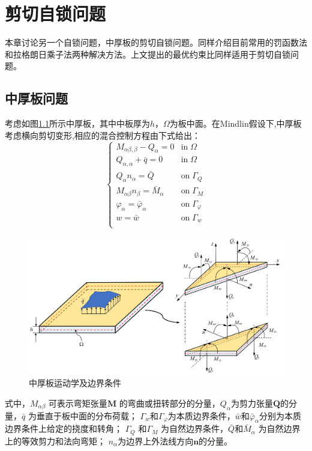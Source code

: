 \chapter{剪切自锁问题}
本章讨论另一个自锁问题，中厚板的剪切自锁问题。同样介绍目前常用的罚函数法和拉格朗日乘子法两种解决方法。上文提出的最优约束比同样适用于剪切自锁问题。

\section{中厚板问题}    
考虑如图\ref{mindlin_picture}所示中厚板，其中中板厚为$h$，$\Omega$为板中面。在Mindlin假设下,中厚板考虑横向剪切变形,相应的混合控制方程由下式给出：
\begin{equation}\label{strong_mindlin}
    \begin{cases}
        M_{\alpha\beta,\beta} - Q_\alpha = 0 & \textrm{in}\; \Omega \\
        Q_{\alpha,\alpha} + \bar q = 0 & \textrm{in}\; \Omega \\    Q_\alpha n_\alpha = \bar Q & \textrm{on}\; \Gamma_Q \\
        M_{\alpha\beta} n_\beta = \bar M_\alpha & \textrm{on}\; \Gamma_M \\
        \varphi_\alpha = \bar \varphi_\alpha & \textrm{on}\; \Gamma_\varphi \\
        w = \bar w & \textrm{on}\; \Gamma_w \\
    \end{cases}
\end{equation}
\begin{figure}[H]
    \centering 
        \includegraphics[scale=0.5]{figures/shearlocking/Mindlinplate.png}
        \caption{中厚板运动学及边界条件}\label{mindlin_picture}
\end{figure}
式中，$M_{\alpha \beta}$ 可表示弯矩张量$ \boldsymbol{M}$ 的弯曲或扭转部分的分量，$Q_\alpha$为剪力张量$\boldsymbol{Q}$的分量，$\bar{q}$ 为垂直于板中面的分布荷载；
$\Gamma_w$和$\Gamma_\varphi$为本质边界条件，$\bar{w}$和$\bar{\varphi}_\alpha$分别为本质边界条件上给定的挠度和转角；
$\Gamma_Q$ 和$\Gamma_M$ 为自然边界条件，$\bar Q$和$\bar{M}_{\alpha}$ 为自然边界上的等效剪力和法向弯矩；
$n_\alpha$为边界上外法线方向$\pmb{n}$的分量。

